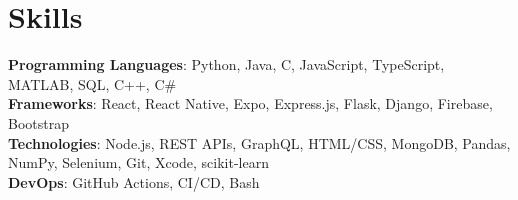 \section{Skills}
    \begin{itemize}[leftmargin=0.15in, label={}]
	\small{\item{
		\textbf{Programming Languages}{: Python, Java, C, JavaScript, TypeScript, MATLAB, SQL, C++, C\#} \\
		\textbf{Frameworks}{: React, React Native, Expo, Express.js, Flask, Django, Firebase, Bootstrap} \\
		\textbf{Technologies}{: Node.js, REST APIs, GraphQL,  HTML/CSS, MongoDB, Pandas, NumPy, Selenium, Git, Xcode, scikit-learn} \\
		\textbf{DevOps}{: GitHub Actions, CI/CD, Bash} \\
	}}
    \end{itemize}
